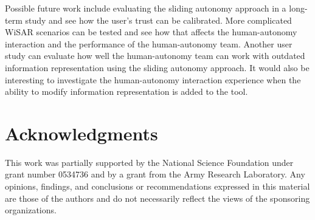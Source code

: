 \documentclass[journal]{IEEEtran}
\begin{document}
Possible future work include evaluating the sliding autonomy approach in a long-term study and see how the user's trust can be calibrated. More complicated WiSAR scenarios can be tested and see how that affects the human-autonomy interaction and the performance of the human-autonomy team. Another user study can evaluate how well the human-autonomy team can work with outdated information representation using the sliding autonomy approach. It would also be interesting to investigate the human-autonomy interaction experience when the ability to modify information representation is added to the tool.

\section*{Acknowledgments}

This work was partially supported by 
the National Science Foundation 
under grant number 
0534736 
and by a grant from
the Army Research Laboratory.
Any opinions, findings, and conclusions or recommendations expressed in this material are those of the authors and do not necessarily reflect the views of the sponsoring organizations.





\end{document}
